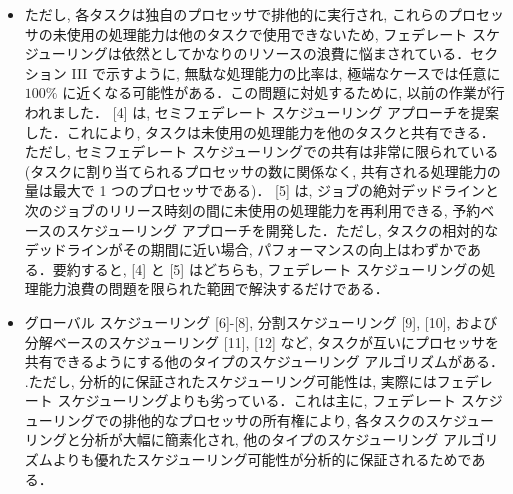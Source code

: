 \begin{frame}{}
    \begin{itemize}
        \item ただし, 各タスクは独自のプロセッサで排他的に実行され, これらのプロセッサの未使用の処理能力は他のタスクで使用できないため, フェデレート スケジューリングは依然としてかなりのリソースの浪費に悩まされている．セクション III で示すように, 無駄な処理能力の比率は, 極端なケースでは任意に $100 \%$ に近くなる可能性がある．この問題に対処するために, 以前の作業が行われました． [4] は, セミフェデレート スケジューリング アプローチを提案した．これにより, タスクは未使用の処理能力を他のタスクと共有できる．ただし, セミフェデレート スケジューリングでの共有は非常に限られている (タスクに割り当てられるプロセッサの数に関係なく, 共有される処理能力の量は最大で 1 つのプロセッサである)． [5] は, ジョブの絶対デッドラインと次のジョブのリリース時刻の間に未使用の処理能力を再利用できる, 予約ベースのスケジューリング アプローチを開発した．ただし, タスクの相対的なデッドラインがその期間に近い場合, パフォーマンスの向上はわずかである．要約すると, [4] と [5] はどちらも, フェデレート スケジューリングの処理能力浪費の問題を限られた範囲で解決するだけである．
    \end{itemize}
\end{frame}

\begin{frame}{}
    \begin{itemize}
        \item グローバル スケジューリング [6]-[8], 分割スケジューリング [9], [10], および分解ベースのスケジューリング [11], [12] など, タスクが互いにプロセッサを共有できるようにする他のタイプのスケジューリング アルゴリズムがある． .ただし, 分析的に保証されたスケジューリング可能性は, 実際にはフェデレート スケジューリングよりも劣っている．これは主に, フェデレート スケジューリングでの排他的なプロセッサの所有権により, 各タスクのスケジューリングと分析が大幅に簡素化され, 他のタイプのスケジューリング アルゴリズムよりも優れたスケジューリング可能性が分析的に保証されるためである．
    \end{itemize}
\end{frame}

